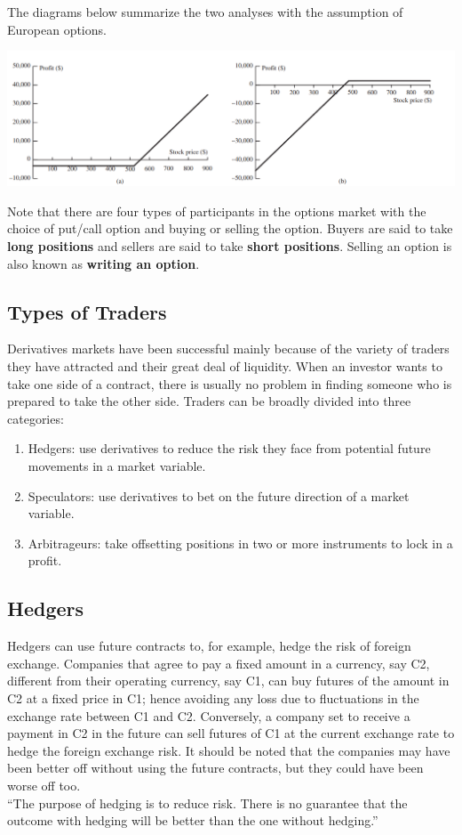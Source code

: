 \documentclass{article}
\begin{document}
The diagrams below summarize the two analyses with the assumption
of European options.
\begin{center}
    \includegraphics[width=6in]{rsrc/trading-options.png}
\end{center}
Note that there are four types of participants in the options market with
the choice of put/call option and buying or selling the option. Buyers are said
to take \textbf{long positions} and sellers are said to take \textbf{short positions}.
Selling an option is also known as \textbf{writing an option}.
\subsection{Types of Traders}
Derivatives markets have been successful mainly because of the variety of traders
they have attracted and their great deal of liquidity. When an investor wants to take
one side of a contract, there is usually no problem in finding someone who is prepared
to take the other side. Traders can be broadly divided into three categories:
\begin{enumerate}
    \item Hedgers: use derivatives to reduce the risk they face from potential future movements
    in a market variable.
    \item Speculators: use derivatives to bet on the future direction of a market variable.
    \item Arbitrageurs: take offsetting positions in two or more instruments to lock in a profit. 
\end{enumerate}
\subsection{Hedgers}
Hedgers can use future contracts to, for example, hedge the risk of foreign exchange. Companies
that agree to pay a fixed amount in a currency, say C2, different from their operating currency,
say C1, can buy futures of the amount in C2 at a fixed price in C1; hence avoiding any loss
due to fluctuations in the exchange rate between C1 and C2. Conversely, a company set to receive
a payment in C2 in the future can sell futures of C1 at the current exchange rate to hedge
the foreign exchange risk. It should be noted that the companies may have been better off
without using the future contracts, but they could have been worse off too.\\
``The purpose of hedging is to reduce risk. There is no guarantee that the outcome with
hedging will be better than the one without hedging.''\\
\end{document}
